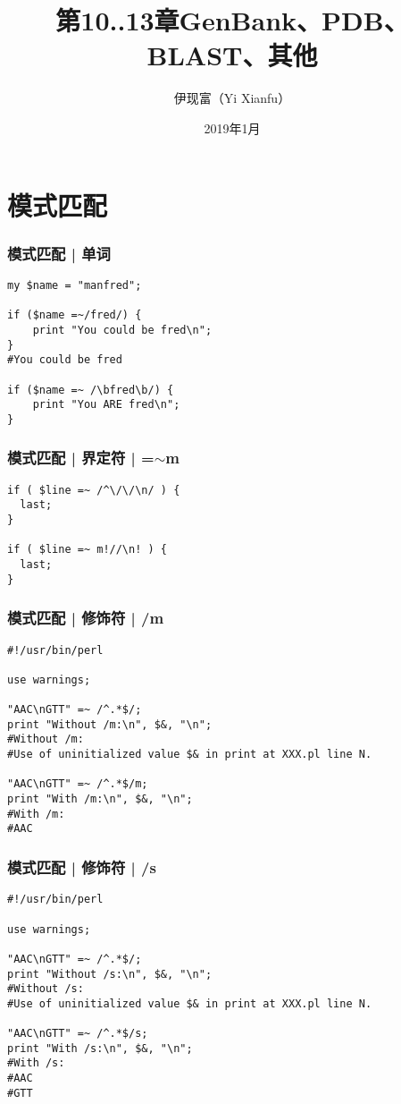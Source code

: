 


\title[其他]{第10..13章\quad GenBank、PDB、BLAST、其他}
\author[Yixf]{伊现富（Yi Xianfu）}
\date{2019年1月}




\section{模式匹配}
\begin{frame}[fragile]
  \frametitle{模式匹配 | 单词}
  \vspace{-1.5em}
\begin{lstlisting}
my $name = "manfred";

if ($name =~/fred/) {
    print "You could be fred\n";
}
#You could be fred

if ($name =~ /\bfred\b/) {
    print "You ARE fred\n";
}
\end{lstlisting}
\end{frame}

\begin{frame}[fragile]
  \frametitle{模式匹配 | 界定符 | =$\sim$m}
  \vspace{-1.5em}
\begin{lstlisting}
if ( $line =~ /^\/\/\n/ ) {
  last;
}

if ( $line =~ m!//\n! ) {
  last;
}
\end{lstlisting}
\end{frame}

\begin{frame}[fragile]
  \frametitle{模式匹配 | 修饰符 | /m}
  \vspace{-1.5em}
\begin{lstlisting}
#!/usr/bin/perl

use warnings;

"AAC\nGTT" =~ /^.*$/;
print "Without /m:\n", $&, "\n";
#Without /m:
#Use of uninitialized value $& in print at XXX.pl line N.

"AAC\nGTT" =~ /^.*$/m;
print "With /m:\n", $&, "\n";
#With /m:
#AAC
\end{lstlisting}
\end{frame}

\begin{frame}[fragile]
  \frametitle{模式匹配 | 修饰符 | /s}
  \vspace{-1.5em}
\begin{lstlisting}
#!/usr/bin/perl

use warnings;

"AAC\nGTT" =~ /^.*$/;
print "Without /s:\n", $&, "\n";
#Without /s:
#Use of uninitialized value $& in print at XXX.pl line N.

"AAC\nGTT" =~ /^.*$/s;
print "With /s:\n", $&, "\n";
#With /s:
#AAC
#GTT
\end{lstlisting}
\end{frame}

